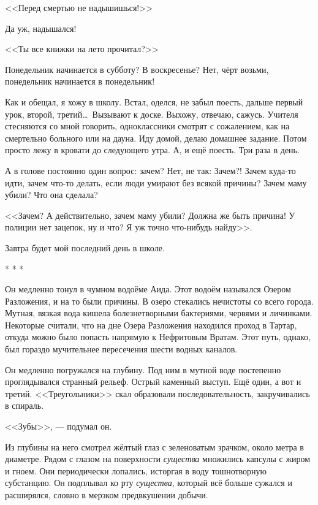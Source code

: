 \documentclass[openany, oneside]{book}
\begin{document}
<<Перед смертью не надышишься!>>

Да уж, надышался!

<<Ты все книжки на лето прочитал?>>

Понедельник начинается в субботу? В воскресенье? Нет, чёрт возьми, понедельник начинается в понедельник!

Как и обещал, я хожу в школу. Встал, оделся, не забыл поесть, дальше первый урок, второй, третий\dots \ Вызывают к доске. Выхожу, отвечаю, сажусь. Учителя стесняются со мной говорить, одноклассники смотрят с сожалением, как на смертельно больного или на дауна. Иду домой, делаю домашнее задание. Потом просто лежу в кровати до следующего утра. А, и ещё поесть. Три раза в день.

А в голове постоянно один вопрос: зачем? Нет, не так: Зачем?! Зачем куда-то идти, зачем что-то делать, если люди умирают без всякой причины? Зачем маму убили? Что она сделала?

<<Зачем? А действительно, зачем маму убили? Должна же быть причина! У полиции нет зацепок, ну и что? Я уж точно что-нибудь найду>>.

Завтра будет мой последний день в школе.

\begin{center}
    * * *
\end{center}

Он медленно тонул в чумном водоёме Аида. Этот водоём назывался Озером Разложения, и на то были причины. В озеро стекались нечистоты со всего города. Мутная, вязкая вода кишела болезнетворными бактериями, червями и личинками. Некоторые считали, что на дне Озера Разложения находился проход в Тартар, откуда можно было попасть напрямую к Нефритовым Вратам. Этот путь, однако, был гораздо мучительнее пересечения шести водных каналов.

Он медленно погружался на глубину. Под ним в мутной воде постепенно проглядывался странный рельеф. Острый каменный выступ. Ещё один, а вот и третий. <<Треугольники>> скал образовали последовательность, закручивались в спираль.

<<Зубы>>, --- подумал он.

Из глубины на него смотрел жёлтый глаз с зеленоватым зрачком, около метра в диаметре. Рядом с глазом на поверхности \textit{существа} множились капсулы с жиром и гноем. Они периодически лопались, исторгая в воду тошнотворную субстанцию. Он подплывал ко рту \textit{существа}, который всё больше сужался и расширялся, словно в мерзком предвкушении добычи.
\end{document}
